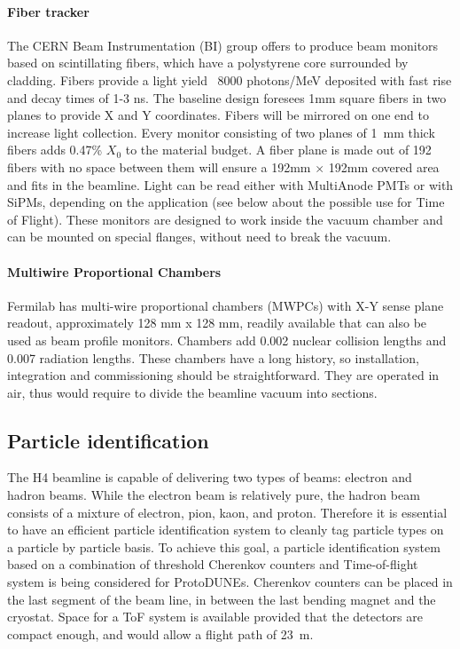 \paragraph{Fiber tracker}
The CERN Beam Instrumentation (BI) group offers to produce
 beam monitors based on scintillating fibers, which have a polystyrene core surrounded by cladding. Fibers provide a light yield ~8000 photons/MeV deposited with fast rise and decay times of 1-3 ns. The baseline design foresees 1mm square fibers in two planes to provide X and Y coordinates. Fibers will be mirrored on one end to increase
light collection.  Every monitor consisting of two planes of 1~mm thick fibers adds 0.47\% $X_0$ to the material budget.
A fiber plane is made out of 192 fibers with no space between them will ensure a  192mm $\times$ 192mm covered area and fits in the beamline.
Light can be read either with MultiAnode PMTs or with SiPMs, depending on the application (see below about the possible use for Time of Flight).
These monitors are designed to work inside the vacuum chamber and can be mounted on special flanges, without need to break the vacuum.

\paragraph{Multiwire Proportional Chambers}
Fermilab has multi-wire proportional chambers (MWPCs) with X-Y sense plane
readout, approximately 128 mm x 128 mm, readily available that can also be used as beam profile monitors. 
Chambers add 0.002 nuclear collision lengths and 0.007 radiation lengths.
 These chambers have a long history, so installation, integration and commissioning should be straightforward. They are operated in air, thus would require to divide the beamline vacuum into sections.


\subsection{Particle identification}
The H4 beamline is capable of delivering two types of beams: electron and hadron beams. While the electron beam is relatively pure, the hadron beam consists of a mixture of electron, pion, kaon, and proton. Therefore it is essential to have an efficient particle identification system to cleanly tag particle types on a particle by particle basis. To achieve this goal, a particle identification system based on a combination of threshold Cherenkov counters and Time-of-flight system is being considered for ProtoDUNEs. 
Cherenkov counters can be placed in the last segment of the beam line, in between the last bending magnet and the cryostat. Space for a ToF system is available provided that the detectors are compact enough,
and would allow a flight path of 23~m.

